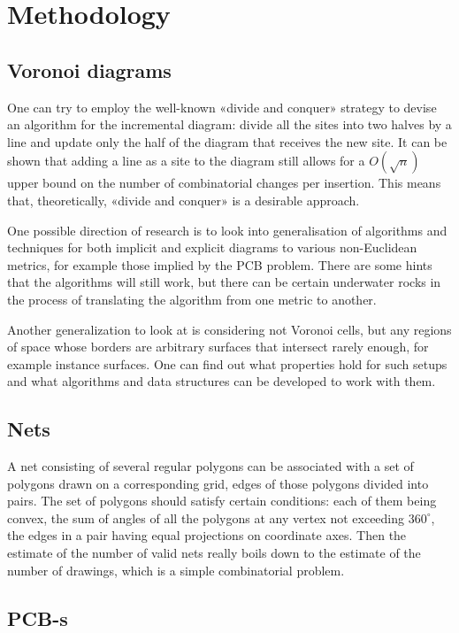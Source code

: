 \documentclass[a4paper,11pt]{article}
\begin{document}
\section{Methodology}

\subsection{Voronoi diagrams}

One can try to employ the well-known «divide and conquer» strategy to devise an algorithm for the incremental diagram: divide all the sites into two halves by a line and update only the half of the diagram that receives the new site. It can be shown that adding a line as a site to the diagram still allows for a $O(\sqrt{n})$ upper bound on the number of combinatorial changes per insertion. This means that, theoretically, «divide and conquer» is a desirable approach.

One possible direction of research is to look into generalisation of algorithms and techniques for both implicit and explicit diagrams to various non-Euclidean metrics, for example those implied by the PCB problem. There are some hints that the algorithms will still work, but there can be certain underwater rocks in the process of translating the algorithm from one metric to another.

Another generalization to look at is considering not Voronoi cells, but any regions of space whose borders are arbitrary surfaces that intersect rarely enough, for example instance surfaces. One can find out what properties hold for such setups and what algorithms and data structures can be developed to work with them.

\subsection{Nets}

A net consisting of several regular polygons can be associated with a set of polygons drawn on a corresponding grid, edges of those polygons divided into pairs. The set of polygons should satisfy certain conditions: each of them being convex, the sum of angles of all the polygons at any vertex not exceeding \(360^\circ\), the edges in a pair having equal projections on coordinate axes. Then the estimate of the number of valid nets really boils down to the estimate of the number of drawings, which is a simple combinatorial problem.

\subsection{PCB-s}
\end{document}
